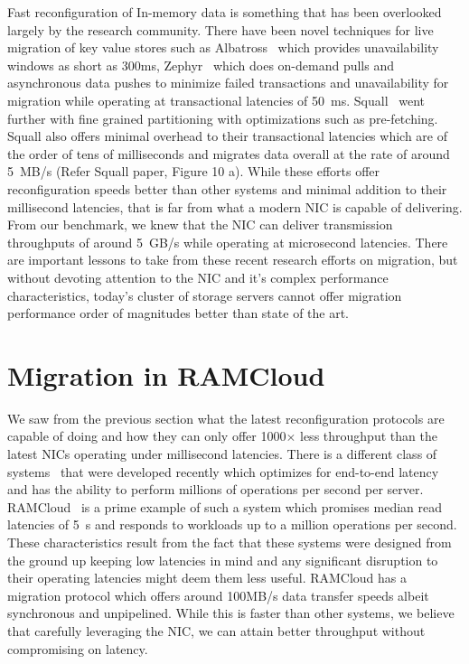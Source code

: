 Fast reconfiguration of In-memory data is something that has been overlooked largely
by the research community. There have been novel techniques for live migration of 
key value stores such as Albatross~\cite{albatross} which provides unavailability windows 
as short as 300ms, Zephyr~\cite{zephyr} which does on-demand pulls and asynchronous data 
pushes to minimize failed transactions and unavailability for migration while operating 
at transactional latencies of 50~ms. Squall~\cite{squall} went further with fine grained 
partitioning with optimizations such as pre-fetching. Squall also offers minimal overhead 
to their transactional latencies which are of the order of tens of milliseconds and migrates 
data overall at the rate of around 5~MB/s (Refer Squall paper, Figure 10 a). While these efforts offer reconfiguration speeds 
better than other systems and minimal addition to their millisecond latencies, that is far 
from what a modern NIC is capable of delivering. From our benchmark, we knew that the NIC 
can deliver transmission throughputs of around 5~GB/s while operating at microsecond latencies. 
There are important lessons to take from these recent research efforts on migration, but without 
devoting attention to the NIC and it's complex performance characteristics, today's cluster of
storage servers cannot offer migration performance order of magnitudes better than state of the art.

\section{Migration in RAMCloud}
We saw from the previous section what the latest reconfiguration protocols are capable of doing and how they can only 
offer 1000$\times$ less throughput than the latest NICs operating under millisecond latencies. There is a different class of systems~\cite{ramcloud,farm,rdmabillion,herd} that 
were developed recently which optimizes for end-to-end latency and has the ability to perform millions of operations 
per second per server. RAMCloud~\cite{ramcloud} is a prime example of such a system which promises median read latencies 
of 5\textmu~s and responds to workloads up to a million operations per second. These characteristics result from the fact that 
these systems were designed from the ground up keeping low latencies in mind and any significant disruption to their operating 
latencies might deem them less useful. RAMCloud has a migration protocol which offers around 100MB/s data transfer speeds albeit 
synchronous and unpipelined. While this is faster than other systems, we believe that carefully leveraging the NIC, 
we can attain better throughput without compromising on latency.

